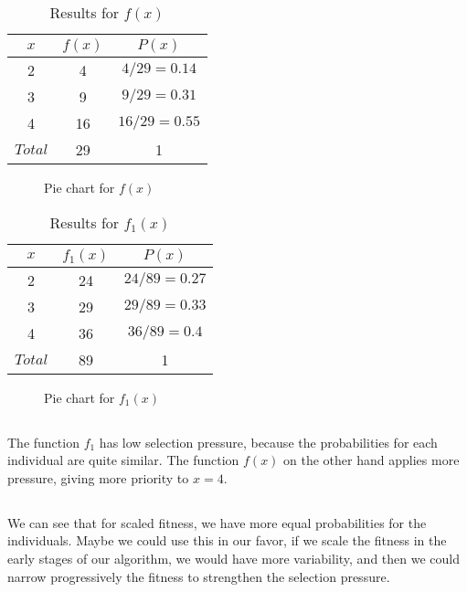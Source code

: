 \documentclass{scrartcl}
\begin{document}
\begin{table}[h!]
\centering
\begin{tabular}{| c | c | c |}
\hline
$x$ & $f(x)$ & $P(x)$ \\ 
\hline
2 & 4 & $4/29 = 0.14$ \\  
\hline
3 & 9 & $9/29 = 0.31$ \\  
\hline
4 & 16 & $16/29 = 0.55$ \\  
\hline
$Total$ & 29 & 1 \\
\hline
\end{tabular}
\caption{Results for $f(x)$}
\label{table:table2_1_1}
\end{table}

\begin{figure}[h!]
\centering

\caption{Pie chart for $f(x)$}
\label{fig:pie2_1_1}
\end{figure}

\begin{table}[h!]
\centering
\begin{tabular}{| c | c | c |}
 \hline
 $x$ & $f_1(x)$ & $P(x)$ \\ 
 \hline
 2 & 24 & $24/89 = 0.27$ \\  
 \hline
 3 & 29 & $29/89 = 0.33$ \\  
 \hline
 4 & 36 & $36/89 = 0.4$ \\  
 \hline
 $Total$ & 89 & 1 \\
\hline
\end{tabular}
\caption{Results for $f_1(x)$}
\label{table:table2_1_2}
\end{table}

\begin{figure}[h!]
    \centering
    \caption{Pie chart for $f_1(x)$}
    \label{fig:pie2_1_2}
\end{figure}

\subsection{}
The function $f_1$ has low selection pressure, because the probabilities for each individual are quite similar. The function $f(x)$ on the other hand applies more pressure, giving more priority to $x=4$.
\subsection{}
We can see that for scaled fitness, we have more equal probabilities for the individuals. Maybe we could use this in our favor, if we scale the fitness in the early stages of our algorithm, we would have more variability, and then we could narrow progressively the fitness to strengthen the selection pressure.
\end{document}
